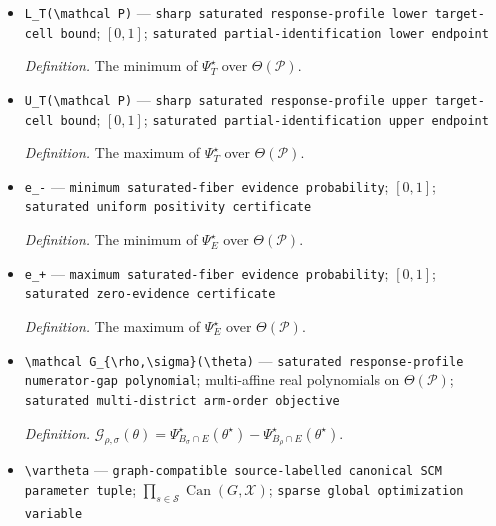\documentclass{article}
\begin{document}
\begin{itemize}
  \par\smallskip\noindent\emph{Definition.} \texttt{The response-\allowbreak{}profile tuples satisfying independent district laws,\allowbreak{} unchanged-\allowbreak{}district equalities,\allowbreak{} and every complete supplied-\allowbreak{}menu cell equation.}
  \item \texttt{L\_\allowbreak{}T(\textbackslash{}\allowbreak{}mathcal P)} --- \texttt{sharp saturated response-\allowbreak{}profile lower target-\allowbreak{}cell bound}; \([0,1]\); \texttt{saturated partial-\allowbreak{}identification lower endpoint}
  \par\smallskip\noindent\emph{Definition.} The minimum of \(\Psi_T^\star\) over \(\Theta(\mathcal P)\).
  \item \texttt{U\_\allowbreak{}T(\textbackslash{}\allowbreak{}mathcal P)} --- \texttt{sharp saturated response-\allowbreak{}profile upper target-\allowbreak{}cell bound}; \([0,1]\); \texttt{saturated partial-\allowbreak{}identification upper endpoint}
  \par\smallskip\noindent\emph{Definition.} The maximum of \(\Psi_T^\star\) over \(\Theta(\mathcal P)\).
  \item \texttt{e\_\allowbreak{}-\allowbreak{}} --- \texttt{minimum saturated-\allowbreak{}fiber evidence probability}; \([0,1]\); \texttt{saturated uniform positivity certificate}
  \par\smallskip\noindent\emph{Definition.} The minimum of \(\Psi_E^\star\) over \(\Theta(\mathcal P)\).
  \item \texttt{e\_\allowbreak{}+\allowbreak{}} --- \texttt{maximum saturated-\allowbreak{}fiber evidence probability}; \([0,1]\); \texttt{saturated zero-\allowbreak{}evidence certificate}
  \par\smallskip\noindent\emph{Definition.} The maximum of \(\Psi_E^\star\) over \(\Theta(\mathcal P)\).
  \item \texttt{\textbackslash{}\allowbreak{}mathcal G\_\allowbreak{}\{\textbackslash{}\allowbreak{}rho,\allowbreak{}\textbackslash{}\allowbreak{}sigma\}\allowbreak{}(\textbackslash{}\allowbreak{}theta)} --- \texttt{saturated response-\allowbreak{}profile numerator-\allowbreak{}gap polynomial}; multi-affine real polynomials on \(\Theta(\mathcal P)\); \texttt{saturated multi-\allowbreak{}district arm-\allowbreak{}order objective}
  \par\smallskip\noindent\emph{Definition.} \(\mathcal G_{\rho,\sigma}(\theta)=\Psi_{B_\sigma\cap E}^\star(\theta^\star)-\Psi_{B_\rho\cap E}^\star(\theta^\star)\).
  \item \texttt{\textbackslash{}\allowbreak{}vartheta} --- \texttt{graph-\allowbreak{}compatible source-\allowbreak{}labelled canonical SCM parameter tuple}; \(\prod_{s\in\mathcal S}\operatorname{Can}(G,\mathcal X)\); \texttt{sparse global optimization variable}

\end{itemize}
\end{document}
